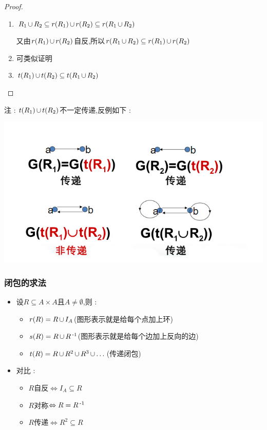 {{{\begin{enumerate}
{\begin{proof}
            \begin{enumerate}
              \item {
                    $R_1 \operatorname{\cup} R_2 \subseteq r(R_1) \operatorname{\cup} r(R_2) \subseteq r(R_1 \operatorname{\cup} R_2)$

                    又由$r(R_1) \operatorname{\cup} r(R_2)$自反,所以$r(R_1 \operatorname{\cup} R_2) \subseteq r(R_1) \operatorname{\cup} r(R_2)$
                    }
              \item 可类似证明
              \item $t(R_1) \operatorname{\cup} t(R_2) \subseteq t(R_1 \operatorname{\cup} R_2)$
            \end{enumerate}
          \end{proof}
          注 : $t(R_1) \operatorname{\cup} t(R_2)$不一定传递,反例如下 :

          \begin{center}
            \includegraphics{resources/transivity_closure_2.png}
          \end{center}
          }
  \end{enumerate}
}%

\subsubsection{闭包的求法}{
  \begin{itemize}
    \item 设$R \subseteq A \times A$且$A \neq \emptyset$,则 : \begin{itemize}
            \item $r(R) = R \operatorname{\cup} I_A$(图形表示就是给每个点加上环)
            \item $s(R) = R \operatorname{\cup} R\operatorname{^{-1}}$(图形表示就是给每个边加上反向的边)
            \item $t(R) = R \operatorname{\cup} R^2 \operatorname{\cup} R^3 \operatorname{\cup} \dots$(传递闭包)
          \end{itemize}
    \item 对比 : \begin{itemize}
            \item $R$自反$\Leftrightarrow I_A \subseteq R$
            \item $R$对称$\Leftrightarrow R = R\operatorname{^{-1}}$
            \item $R$传递$\Leftrightarrow R^2 \subseteq R$
          \end{itemize}
  \end{itemize}

}}}
